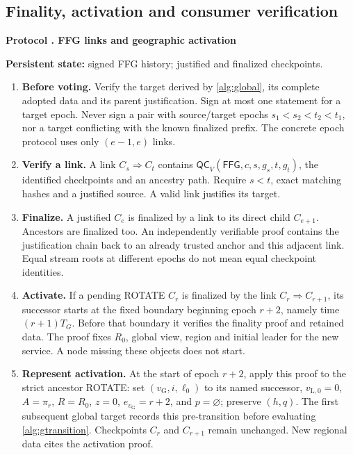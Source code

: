 \documentclass[11pt,a4paper,onecolumn]{article}
\newcommand{\QC}{\mathsf{QC}}
\newcommand{\gv}{v_{\mathrm G}}
\newcommand{\Tag}[1]{\mathsf{#1}}
\theoremstyle{remark}\newtheorem{example}[definition]{Example}
\newcounter{protocol}
\newenvironment{protocol}[2]{\refstepcounter{protocol}\label{#1}\begin{mdframed}[nobreak=true,linewidth=.6pt,skipabove=10pt,skipbelow=10pt,innertopmargin=8pt,innerbottommargin=8pt]\small\raggedright\noindent\textbf{Protocol \theprotocol. #2}\par\smallskip}{\end{mdframed}}
\begin{document}
\subsection{Finality, activation and consumer verification}\label{sec:finality}
\begin{protocol}{alg:finality}{FFG links and geographic activation}
\textbf{Persistent state:} signed FFG history; justified and finalized checkpoints.
\begin{enumerate}[label=\textbf{F\arabic*.}]
\item \textbf{Before voting.} Verify the target derived by \cref{alg:global},
its complete adopted data and its parent justification. Sign at most one
statement for a target epoch. Never sign a pair with source/target epochs
$s_1<s_2<t_2<t_1$, nor a target conflicting with the known finalized prefix.
The concrete epoch protocol uses only $(e-1,e)$ links.
\item \textbf{Verify a link.} A link $C_s\Rightarrow C_t$ contains
$\QC_V(\Tag{FFG},c,s,g_s,t,g_t)$, the identified checkpoints and an ancestry
path. Require $s<t$, exact matching hashes and a justified source.
A valid link justifies its target.
\item \textbf{Finalize.} A justified $C_e$ is finalized by a link to its direct
child $C_{e+1}$. Ancestors are finalized too. An independently verifiable proof
contains the justification chain back to an already trusted anchor and this
adjacent link. Equal stream roots at different epochs do not mean equal
checkpoint identities.
\item \textbf{Activate.} If a pending ROTATE $C_r$ is finalized by the link
$C_r\Rightarrow C_{r+1}$, its successor starts at the fixed boundary beginning
epoch $r+2$, namely time $(r+1)T_G$. Before that boundary it verifies the finality
proof and retained data. The proof fixes $R_0$, global view, region and initial
leader for the new service. A node missing these objects does not start.
\item \textbf{Represent activation.} At the start of epoch $r+2$, apply this
proof to the strict ancestor ROTATE: set $(\gv,i,\ell_0)$ to its named successor,
$v_{\mathrm L,0}=0$, $A=\pi_r$, $R=R_0$, $z=0$, $e_{\gv}=r+2$, and $p=\varnothing$;
preserve $(h,q)$. The first subsequent global target records this pre-transition
before evaluating \cref{alg:gtransition}. Checkpoints $C_r$ and
$C_{r+1}$ remain unchanged. New regional data cites the activation proof.
\end{enumerate}
\end{protocol}
\end{document}
